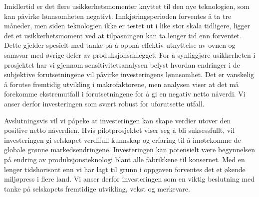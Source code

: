 \indent \newline
Imidlertid er det flere usikkerhetsmomenter knyttet til den nye teknologien, som kan påvirke lønnsomheten negativt. Innkjøringsperioden forventes å ta tre måneder, men siden teknologien ikke er testet ut i like stor skala tidligere, ligger det et usikkerhetsmoment ved at tilpasningen kan ta lenger tid enn forventet. Dette gjelder spesielt med tanke på å oppnå effektiv utnyttelse av ovnen og samsvar med øvrige deler av produksjonsanlegget. For å synliggjøre usikkerheten i prosjektet har vi gjennom sensitivitetsanalysen belyst hvordan endringer i de subjektive forutsetningene vil påvirke investeringens lønnsomhet. Det er vanskelig å forutse fremtidig utvikling i makrofaktorene, men analysen viser at det må forekomme ekstremutfall i forutsetningene for å gi en negativ netto nåverdi. Vi anser derfor investeringen som svært robust for uforutsette utfall.

\indent \newline
Avslutningsvis vil vi påpeke at investeringen kan skape verdier utover den positive netto nåverdien. Hvis pilotprosjektet viser seg å bli suksessfullt, vil investeringen gi selskapet verdifull kunnskap og erfaring til å imøtekomme de globale grønne markedsendringene. Investeringen kan potensielt være begynnelsen på endring av produksjonsteknologi blant alle fabrikkene til konsernet. Med en lenger tidshorisont enn vi har lagt til grunn i oppgaven forventes det et økende miljøpress i flere land. Vi anser derfor investeringen som en viktig beslutning med tanke på selskapets fremtidige utvikling, vekst og merkevare.
